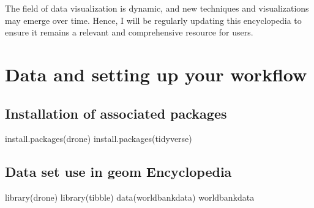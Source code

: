 \documentclass[
  letterpaper,
  DIV=11,
  numbers=noendperiod]{scrreprt}
\newenvironment{Shaded}{\begin{snugshade}}{\end{snugshade}}
\newcommand{\FunctionTok}[1]{\textcolor[rgb]{0.28,0.35,0.67}{#1}}
\newcommand{\NormalTok}[1]{\textcolor[rgb]{0.00,0.23,0.31}{#1}}
\begin{document}

The field of data visualization is dynamic, and new techniques and
visualizations may emerge over time. Hence, I will be regularly updating
this encyclopedia to ensure it remains a relevant and comprehensive
resource for users.


\chapter*{Data and setting up your
workflow}\label{data-and-setting-up-your-workflow}


\section*{Installation of associated
packages}\label{installation-of-associated-packages}


\begin{Shaded}
\begin{Highlighting}[]
\FunctionTok{install.packages}\NormalTok{(drone)}
\FunctionTok{install.packages}\NormalTok{(tidyverse)}
\end{Highlighting}
\end{Shaded}

\section*{Data set use in geom
Encyclopedia}\label{data-set-use-in-geom-encyclopedia}


\begin{Shaded}
\begin{Highlighting}[]
\FunctionTok{library}\NormalTok{(drone)}
\FunctionTok{library}\NormalTok{(tibble)}
\FunctionTok{data}\NormalTok{(worldbankdata)}
\NormalTok{worldbankdata}
\end{Highlighting}
\end{Shaded}
\end{document}
